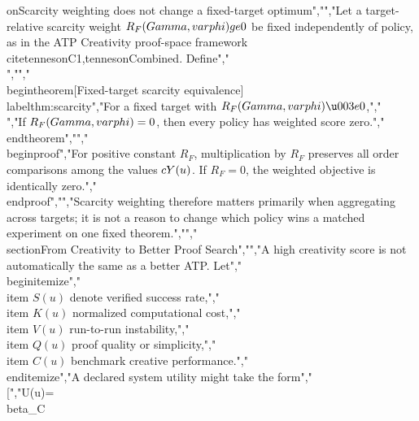{{{on{Scarcity weighting does not change a fixed-target optimum}","","Let a target-relative scarcity weight $R_F(\\Gamma,\\varphi)\\ge0$ be fixed independently of policy, as in the ATP Creativity proof-space framework \\cite{tennesonC1,tennesonCombined}. Define","\\[","\\cY_F^\\star(u)=R_F(\\Gamma,\\varphi)\\cY(u).","\\]","","\\begin{theorem}[Fixed-target scarcity equivalence]\\label{thm:scarcity}","For a fixed target with $R_F(\\Gamma,\\varphi)\u003e0$,","\\[","\\arg\\max_u \\cY_F^\\star(u)","=","\\arg\\max_u \\cY(u).","\\]","If $R_F(\\Gamma,\\varphi)=0$, then every policy has weighted score zero.","\\end{theorem}","","\\begin{proof}","For positive constant $R_F$, multiplication by $R_F$ preserves all order comparisons among the values $\\cY(u)$. If $R_F=0$, the weighted objective is identically zero.","\\end{proof}","","Scarcity weighting therefore matters primarily when aggregating across targets; it is not a reason to change which policy wins a matched experiment on one fixed theorem.","","\\section{From Creativity to Better Proof Search}","","A high creativity score is not automatically the same as a better ATP. Let","\\begin{itemize}","\\item $S(u)$ denote verified success rate,","\\item $K(u)$ normalized computational cost,","\\item $V(u)$ run-to-run instability,","\\item $Q(u)$ proof quality or simplicity,","\\item $C(u)$ benchmark creative performance.","\\end{itemize}","A declared system utility might take the form","\\[","U(u)=\\beta_C }}}

